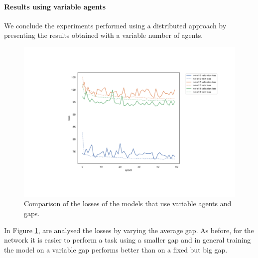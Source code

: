 \paragraph*{Results using variable agents}
We conclude the experiments performed using a distributed approach by 
presenting the results obtained with a variable number of agents. 
\begin{figure}[H]
	\centering
	\includegraphics[width=.8\textwidth]{contents/images/task1-extension/loss-distributed-Nvar@}%
	\caption[Comparison of the losses of the models that use variable 
	agents.]{Comparison of the losses of the models that use variable agents 
	and gaps.}
	\label{fig:distlossnvar}
\end{figure}

\noindent
In Figure \ref{fig:distlossnvar}, are analysed the losses by varying the average 
gap. As before, for the network it is easier to perform a task using a smaller gap 
and in general training the model on a variable gap performs better than on a 
fixed but big gap.

